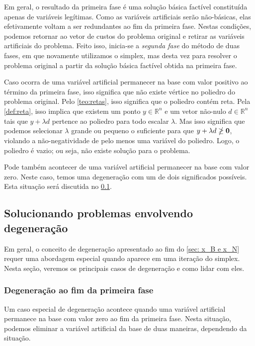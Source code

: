 Em geral, o resultado da primeira fase é uma solução básica factível constituída apenas de variáveis legítimas. Como as variáveis artificiais serão não-básicas, elas efetivamente voltam a ser redundantes ao fim da primeira fase. Nestas condições, podemos retornar ao vetor de custos do problema original e retirar as variáveis artificiais do problema. Feito isso, inicia-se a \emph{segunda fase} do método de duas fases, em que novamente utilizamos o simplex, mas desta vez para resolver o problema original a partir da solução básica factível obtida na primeira fase.

Caso ocorra de uma variável artificial permanecer na base com valor positivo ao término da primeira fase, isso significa que não existe vértice no poliedro do problema original. Pelo \cref{teo:retas}, isso significa que o poliedro contém reta. Pela \cref{def:reta}, isso implica que existem um ponto $ y \in \mathbb{R}^n$ e um vetor não-nulo $ d \in \mathbb{R}^n$ tais que $ y + \lambda  d$ pertence ao poliedro para todo escalar $\lambda$. Mas isso significa que podemos selecionar $\lambda$ grande ou pequeno o suficiente para que $ y + \lambda  d \ngeq \vb 0$, violando a não-negatividade de pelo menos uma variável do poliedro. Logo, o poliedro é vazio; ou seja, não existe solução para o problema.

Pode também acontecer de uma variável artificial permanecer na base com valor zero. Neste caso, temos uma degeneração com um de dois significados possíveis. Esta situação será discutida no \cref{sec:degeneração}.

\subsection{Solucionando problemas envolvendo degeneração}\label{sec:degeneração}
Em geral, o conceito de degeneração apresentado ao fim do \cref{sec: x_B e x_N} requer uma abordagem especial quando aparece em uma iteração do simplex. Nesta seção, veremos os principais casos de degeneração e como lidar com eles.

\subsubsection{Degeneração ao fim da primeira fase}
Um caso especial de degeneração acontece quando uma variável artificial permanece na base com valor zero ao fim da primeira fase. Nesta situação, podemos eliminar a variável artificial da base de duas maneiras, dependendo da situação.

